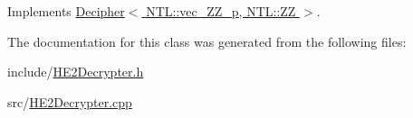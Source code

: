 Implements \hyperlink{classDecipher_a39aea002012130201e12a8fa7d84dda5}{Decipher$<$ N\+T\+L\+::vec\+\_\+\+Z\+Z\+\_\+p, N\+T\+L\+::\+Z\+Z $>$}.



The documentation for this class was generated from the following files\+:\begin{DoxyCompactItemize}
\item 
include/\hyperlink{HE2Decrypter_8h}{H\+E2\+Decrypter.\+h}\item 
src/\hyperlink{HE2Decrypter_8cpp}{H\+E2\+Decrypter.\+cpp}\end{DoxyCompactItemize}

